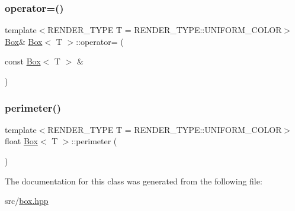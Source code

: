 \mbox{\label{classBox_a6ea0d233bdcce789b46384d22601da8d}} 
\subsubsection{\texorpdfstring{operator=()}{operator=()}\hspace{0.1cm}{\footnotesize\ttfamily [2/2]}}
{\footnotesize\ttfamily template$<$R\+E\+N\+D\+E\+R\+\_\+\+T\+Y\+PE T = R\+E\+N\+D\+E\+R\+\_\+\+T\+Y\+P\+E\+::\+U\+N\+I\+F\+O\+R\+M\+\_\+\+C\+O\+L\+OR$>$ \\
\mbox{\hyperlink{classBox}{Box}}\& \mbox{\hyperlink{classBox}{Box}}$<$ T $>$\+::operator= (\begin{DoxyParamCaption}\item[{const \mbox{\hyperlink{classBox}{Box}}$<$ T $>$ \&}]{ }\end{DoxyParamCaption})\hspace{0.3cm}{\ttfamily [default]}}

\mbox{\label{classBox_ac64e9d619b0f3b991174a2ac49fef899}} 
\subsubsection{\texorpdfstring{perimeter()}{perimeter()}}
{\footnotesize\ttfamily template$<$R\+E\+N\+D\+E\+R\+\_\+\+T\+Y\+PE T = R\+E\+N\+D\+E\+R\+\_\+\+T\+Y\+P\+E\+::\+U\+N\+I\+F\+O\+R\+M\+\_\+\+C\+O\+L\+OR$>$ \\
float \mbox{\hyperlink{classBox}{Box}}$<$ T $>$\+::perimeter (\begin{DoxyParamCaption}{ }\end{DoxyParamCaption})}



The documentation for this class was generated from the following file\+:\begin{DoxyCompactItemize}
\item 
src/\mbox{\hyperlink{box_8hpp}{box.\+hpp}}\end{DoxyCompactItemize}
